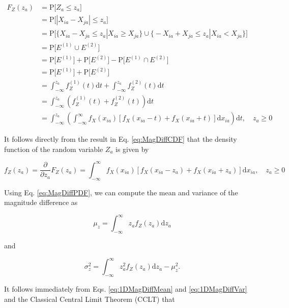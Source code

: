 \documentclass[10pt,letterpaper]{article}\usepackage[]{graphicx}\usepackage[]{color}
\begin{document}
\begin{equation}\label{eq:MagDiffCDF}
\begin{aligned}
F_Z(z_a) &= \text{P}\bigl[Z_a \leq z_a\bigr] \\
&= \text{P}\bigl[|X_{ia} - X_{ja}| \leq z_a\bigr] \\
&= \text{P}\bigl[\bigl\{X_{ia}-X_{ja} \leq z_a | X_{ia} \geq X_{ja}\bigr\} \cup \bigl\{-X_{ia}+X_{ja} \leq z_a | X_{ia} < X_{ja}\bigr\}\bigr] \\
&= \text{P}\bigl[E^{(1)} \cup E^{(2)}\bigr] \\
&= \text{P}\bigl[E^{(1)}\bigr] + \text{P}\bigl[E^{(2)}\bigr] - \text{P}\bigl[E^{(1)} \cap E^{(2)}\bigr] \\
&= \text{P}\bigl[E^{(1)}\bigr] + \text{P}\bigl[E^{(2)}\bigr] \\
&= \int_{-\infty}^{z_a} f^{(1)}_Z(t) \text{d}t + \int_{-\infty}^{z_a} f^{(2)}_Z(t) \text{d}t \\
&= \int_{-\infty}^{z_a} \left(f^{(1)}_Z(t) + f^{(2)}_Z(t)\right) \text{d}t \\
&= \int_{-\infty}^{z_a} \left(\int_{-\infty}^{\infty}f_X(x_{ia})\left[f_X(x_{ia} - t) + f_X(x_{ia} + t)\right] \text{d}x_{ia}\right)\text{d}t, \quad z_a \geq 0
\end{aligned}
\end{equation}

It follows directly from the result in Eq. \ref{eq:MagDiffCDF} that the density function of the random variable $Z_a$ is given by

\begin{equation}\label{eq:MagDiffPDF}
f_Z(z_a) = \frac{\partial}{\partial z_a} F_Z(z_a) = \int_{-\infty}^{\infty} f_X(x_{ia}) \left[f_X(x_{ia} - z_a) + f_X(x_{ia} + z_a)\right] \text{d}x_{ia}, \quad z_a \geq 0
\end{equation}

Using Eq. \ref{eq:MagDiffPDF}, we can compute the mean and variance of the magnitude difference as

\begin{equation}\label{eq:1DMagDiffMean}
\mu_z = \int_{-\infty}^{\infty} z_a f_Z(z_a) \text{d}z_a
\end{equation}

and 

\begin{equation}\label{eq:1DMagDiffVar}
\sigma^2_{z} = \int_{-\infty}^{\infty} z^2_a f_Z(z_a) \text{d}z_a - \mu^2_z.
\end{equation}

It follows immediately from Eqs. \ref{eq:1DMagDiffMean} and \ref{eq:1DMagDiffVar} and the Classical Central Limit Theorem (CCLT) that
\end{document}
